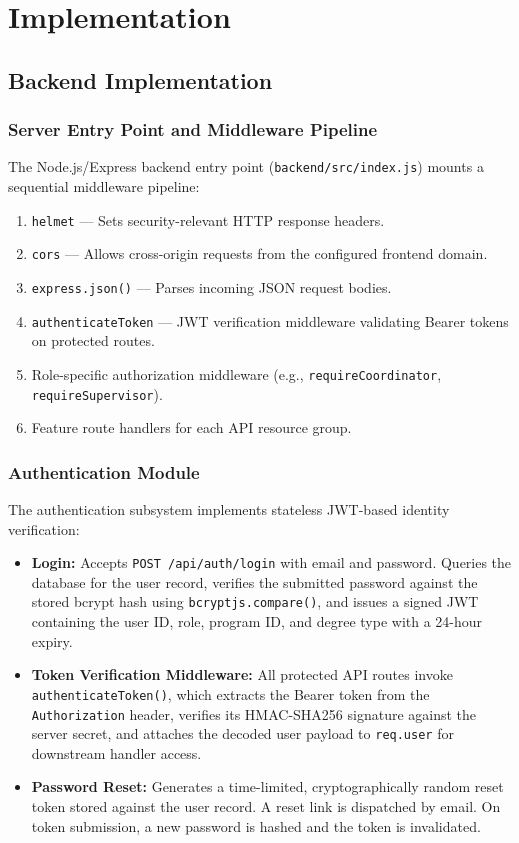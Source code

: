 \chapter{Implementation}

\section{Backend Implementation}

\subsection{Server Entry Point and Middleware Pipeline}
The Node.js/Express backend entry point (\texttt{backend/src/index.js}) mounts a sequential middleware pipeline:
\begin{enumerate}
    \item \texttt{helmet} --- Sets security-relevant HTTP response headers.
    \item \texttt{cors} --- Allows cross-origin requests from the configured frontend domain.
    \item \texttt{express.json()} --- Parses incoming JSON request bodies.
    \item \texttt{authenticateToken} --- JWT verification middleware validating Bearer tokens on protected routes.
    \item Role-specific authorization middleware (e.g., \texttt{requireCoordinator}, \texttt{requireSupervisor}).
    \item Feature route handlers for each API resource group.
\end{enumerate}

\subsection{Authentication Module}
The authentication subsystem implements stateless JWT-based identity verification:
\begin{itemize}
    \item \textbf{Login:} Accepts \texttt{POST /api/auth/login} with email and password. Queries the database for the user record, verifies the submitted password against the stored bcrypt hash using \texttt{bcryptjs.compare()}, and issues a signed JWT containing the user ID, role, program ID, and degree type with a 24-hour expiry.
    \item \textbf{Token Verification Middleware:} All protected API routes invoke \texttt{authenticateToken()}, which extracts the Bearer token from the \texttt{Authorization} header, verifies its HMAC-SHA256 signature against the server secret, and attaches the decoded user payload to \texttt{req.user} for downstream handler access.
    \item \textbf{Password Reset:} Generates a time-limited, cryptographically random reset token stored against the user record. A reset link is dispatched by email. On token submission, a new password is hashed and the token is invalidated.
\end{itemize}

